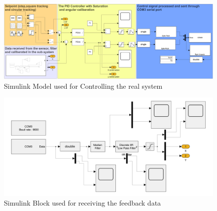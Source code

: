 \begin{figure}
\centering
\includegraphics[width=0.95\textheight]{Figures/chapter04/simulink_real_system_pid_model.png}
\caption{Simulink Model used for Controlling the real system}
\label{fig:IMs matrix correlation}
\end{figure}

\begin{figure}
\centering
\includegraphics[width=0.85\textheight]{Figures/chapter04/simulink_real_system_pid_model_subsys.png}
\caption{Simulink Block used for receiving the feedback data}
\label{fig:IMs matrix correlation}
\end{figure}
